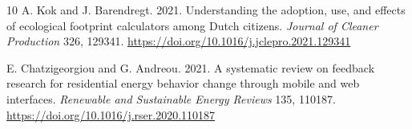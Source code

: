 \documentclass[10pt,a4paper,twocolumn]{article}
\begin{document}
\begin{thebibliography}{10}
A. Kok and J. Barendregt. 2021. Understanding the adoption, use, and effects of ecological footprint calculators among Dutch citizens. \emph{Journal of Cleaner Production} 326, 129341. \url{https://doi.org/10.1016/j.jclepro.2021.129341}

E. Chatzigeorgiou and G. Andreou. 2021. A systematic review on feedback research for residential energy behavior change through mobile and web interfaces. \emph{Renewable and Sustainable Energy Reviews} 135, 110187. \url{https://doi.org/10.1016/j.rser.2020.110187}
\end{thebibliography}
\end{document}

